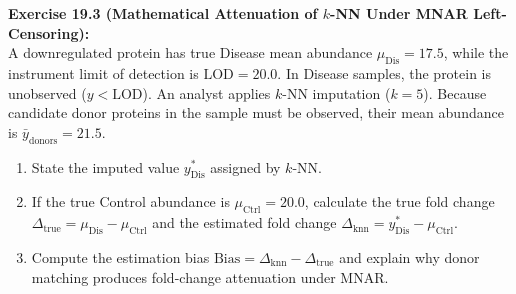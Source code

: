 \documentclass[11pt,oneside]{book}
\begin{document}
\vspace{0.8em}
\noindent
\textbf{Exercise 19.3 (Mathematical Attenuation of $k$-NN Under MNAR Left-Censoring):}\\
A downregulated protein has true Disease mean abundance $\mu_{\text{Dis}} = 17.5$, while the instrument limit of detection is $\text{LOD} = 20.0$. In Disease samples, the protein is unobserved ($y < \text{LOD}$). An analyst applies $k$-NN imputation ($k = 5$). Because candidate donor proteins in the sample must be observed, their mean abundance is $\bar{y}_{\text{donors}} = 21.5$.
\begin{enumerate}
    \item State the imputed value $y_{\text{Dis}}^*$ assigned by $k$-NN.
    \item If the true Control abundance is $\mu_{\text{Ctrl}} = 20.0$, calculate the true fold change $\Delta_{\text{true}} = \mu_{\text{Dis}} - \mu_{\text{Ctrl}}$ and the estimated fold change $\Delta_{\text{knn}} = y_{\text{Dis}}^* - \mu_{\text{Ctrl}}$.
    \item Compute the estimation bias $\text{Bias} = \Delta_{\text{knn}} - \Delta_{\text{true}}$ and explain why donor matching produces fold-change attenuation under MNAR.
\end{enumerate}
\end{document}
